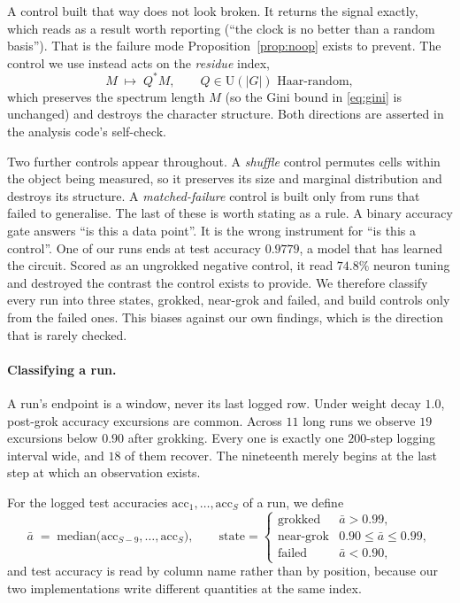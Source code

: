 A control built that way does not look broken. It returns the signal exactly, which reads as
a result worth reporting (``the clock is no better than a random basis''). That is the
failure mode Proposition~\ref{prop:noop} exists to prevent. The control we use instead acts on
the \emph{residue} index,
\begin{equation}
  \label{eq:randorth}
  M \;\longmapsto\; Q^{*} M, \qquad Q \in \mathrm{U}(|G|) \text{ Haar-random},
\end{equation}
which preserves the spectrum length $M$ (so the Gini bound in \eqref{eq:gini} is unchanged)
and destroys the character structure. Both directions are asserted in the analysis code's
self-check.

Two further controls appear throughout. A \emph{shuffle} control permutes cells within the
object being measured, so it preserves its size and marginal distribution and destroys its
structure. A \emph{matched-failure} control is built only from runs that failed to
generalise. The last of these is worth stating as a rule. A binary accuracy gate answers ``is
this a data point''. It is the wrong instrument for ``is this a control''. One of our runs
ends at test accuracy $0.9779$, a model that has learned the circuit. Scored as an ungrokked
negative control, it read $74.8\%$ neuron tuning and destroyed the contrast the control
exists to provide. We therefore classify every run into three states, grokked,
near-grok and failed, and build controls only from the failed ones. This biases against our own
findings, which is the direction that is rarely checked.

\paragraph{Classifying a run.}
A run's endpoint is a window, never its last logged row. Under weight decay $1.0$, post-grok
accuracy excursions are common. Across $11$ long runs we observe $19$ excursions below $0.90$
after grokking. Every one is exactly one $200$-step logging interval wide, and $18$ of them
recover. The nineteenth merely begins at the last step at which an observation exists.

For the logged test accuracies $\mathrm{acc}_{1}, \dots, \mathrm{acc}_{S}$ of a run, we
define
\begin{equation}
  \label{eq:window}
  \bar{a} \;=\; \mathrm{median}\bigl( \mathrm{acc}_{S-9}, \dots, \mathrm{acc}_{S} \bigr),
  \qquad
  \text{state} =
  \begin{cases}
    \text{grokked}   & \bar{a} > 0.99, \\
    \text{near-grok} & 0.90 \le \bar{a} \le 0.99, \\
    \text{failed}    & \bar{a} < 0.90,
  \end{cases}
\end{equation}
and test accuracy is read by column name rather than by position, because our two
implementations write different quantities at the same index.


